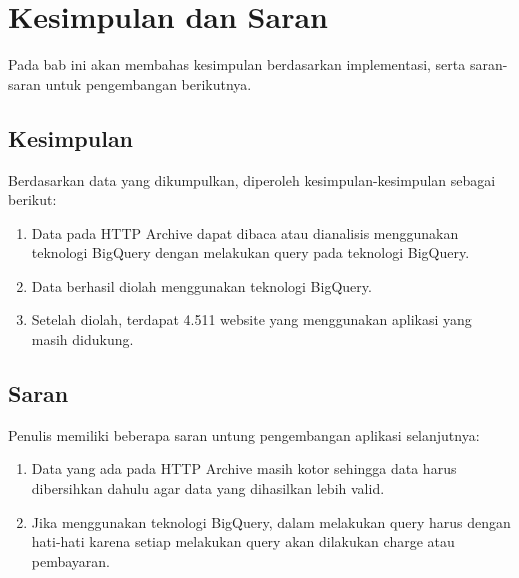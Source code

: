\chapter{Kesimpulan dan Saran}
\label{chap:kesimpulan_dan_saran}

Pada bab ini akan membahas kesimpulan berdasarkan implementasi, serta saran-saran untuk pengembangan berikutnya.

\section{Kesimpulan}
Berdasarkan data yang dikumpulkan, diperoleh kesimpulan-kesimpulan sebagai berikut:
\begin{enumerate}
	\item Data pada HTTP Archive dapat dibaca atau dianalisis menggunakan teknologi BigQuery dengan melakukan query pada teknologi BigQuery.
	\item Data berhasil diolah menggunakan teknologi BigQuery.
	\item Setelah diolah, terdapat 4.511 website yang menggunakan aplikasi yang masih didukung.
\end{enumerate}

\section{Saran}
Penulis memiliki beberapa saran untung pengembangan aplikasi selanjutnya:
\begin{enumerate}
	\item Data yang ada pada HTTP Archive masih kotor sehingga data harus dibersihkan dahulu agar data yang dihasilkan lebih valid.
	\item Jika menggunakan teknologi BigQuery, dalam melakukan query harus dengan hati-hati karena setiap melakukan query akan dilakukan charge atau pembayaran.
\end{enumerate}